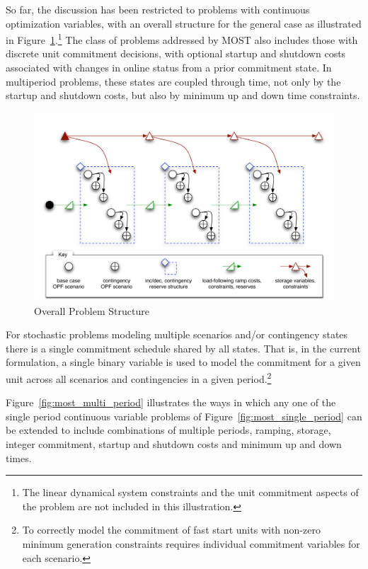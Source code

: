 \documentclass[12pt]{article}
\newcommand{\most}[0]{{MOST}}
\numberwithin{equation}{section}
\numberwithin{table}{section}
\numberwithin{figure}{section}
\begin{document}
So far, the discussion has been restricted to problems with continuous optimization variables, with an overall structure for the general case as illustrated in Figure~\ref{fig:structure}.\footnote{The linear dynamical system constraints and the unit commitment aspects of the problem are not included in this illustration.} The class of problems addressed by \most{} also includes those with discrete unit commitment decisions, with optional startup and shutdown costs associated with changes in online status from a prior commitment state. In multiperiod problems, these states are coupled through time, not only by the startup and shutdown costs, but also by minimum up and down time constraints.

\begin{figure}[hbtp]
  \centering
  \includegraphics[width=\textwidth]{./figures/structure-multi-period}
  \caption{Overall Problem Structure}
  \label{fig:structure}
\end{figure}

For stochastic problems modeling multiple scenarios and/or contingency states there is a single commitment schedule shared by all states. That is, in the current formulation, a single binary variable is used to model the commitment for a given unit across all scenarios and contingencies in a given period.\footnote{To correctly model the commitment of fast start units with non-zero minimum generation constraints requires individual commitment variables for each scenario.}

Figure~\ref{fig:most_multi_period} illustrates the ways in which any one of the single period continuous variable problems of Figure~\ref{fig:most_single_period} can be extended to include combinations of multiple periods, ramping, storage, integer commitment, startup and shutdown costs and minimum up and down times.
\end{document}
